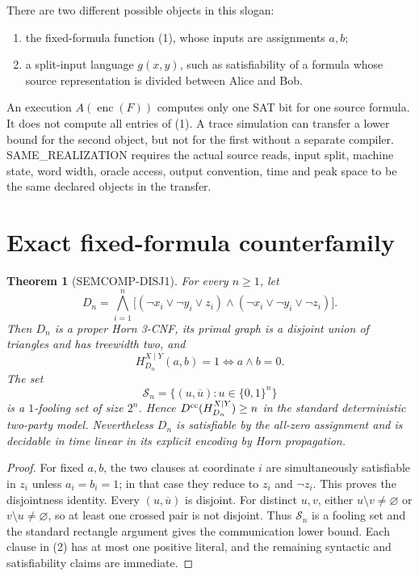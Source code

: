 \documentclass[11pt]{article}
\newtheorem{theorem}{Theorem}
\newcommand{\Dcc}{D^{\rm cc}}
\newcommand{\enc}{\operatorname{enc}}
\begin{document}
There are two different possible objects in this slogan:
\begin{enumerate}[leftmargin=*]
\item the fixed-formula function (1), whose inputs are assignments $a,b$;
\item a split-input language $g(x,y)$, such as satisfiability of a formula
whose source representation is divided between Alice and Bob.
\end{enumerate}
An execution $A(\enc(F))$ computes only one SAT bit for one source formula.
It does not compute all entries of (1).  A trace simulation can transfer a
lower bound for the second object, but not for the first without a separate
compiler.  SAME\_REALIZATION requires the actual source reads, input split,
machine state, word width, oracle access, output convention, time and peak
space to be the same declared objects in the transfer.

\section{Exact fixed-formula counterfamily}
\begin{theorem}[SEMCOMP-DISJ1]
For every $n\ge1$, let
\[
 D_n=\bigwedge_{i=1}^n
 \bigl[(\neg x_i\vee\neg y_i\vee z_i)
 \wedge(\neg x_i\vee\neg y_i\vee\neg z_i)\bigr].                    \tag{2}
\]
Then $D_n$ is a proper Horn 3-CNF, its primal graph is a disjoint union of
triangles and has treewidth two, and
\[
 H_{D_n}^{X\mid Y}(a,b)=1\iff a\wedge b=0.
\]
The set
\[
 \mathcal S_n=\{(u,\overline u):u\in\{0,1\}^n\}
\]
is a $1$-fooling set of size $2^n$.  Hence
$\Dcc(H_{D_n}^{X\mid Y})\ge n$ in the standard deterministic two-party
model.  Nevertheless $D_n$ is satisfiable by the all-zero assignment and is
decidable in time linear in its explicit encoding by Horn propagation.
\end{theorem}
\begin{proof}
For fixed $a,b$, the two clauses at coordinate $i$ are simultaneously
satisfiable in $z_i$ unless $a_i=b_i=1$; in that case they reduce to $z_i$
and $\neg z_i$.  This proves the disjointness identity.  Every
$(u,\overline u)$ is disjoint.  For distinct $u,v$, either
$u\setminus v\ne\varnothing$ or $v\setminus u\ne\varnothing$, so at least
one crossed pair is not disjoint.  Thus $\mathcal S_n$ is a fooling set and
the standard rectangle argument gives the communication lower bound.  Each
clause in (2) has at most one positive literal, and the remaining syntactic
and satisfiability claims are immediate.
\end{proof}
\end{document}
